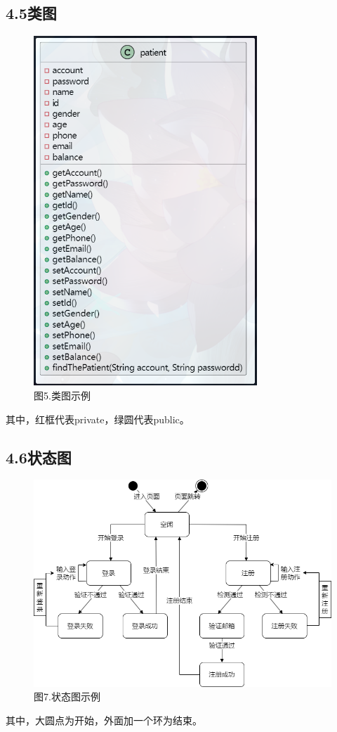 \documentclass[24pt,a4paper]{article}%
\begin{document}
\subsection*{\songti 4.5类图}
\begin{figure}[H]
    \centering
    \includegraphics[width=0.75\textwidth]{images/类图.png}
    \caption*{图5.类图示例}
\end{figure}
其中，红框代表private，绿圆代表public。
\subsection*{\songti 4.6状态图}
\begin{figure}[H]
    \centering
    \includegraphics[width=1\textwidth]{images/状态图.png}
    \caption*{图7.状态图示例}
\end{figure}
其中，大圆点为开始，外面加一个环为结束。
\end{document}
